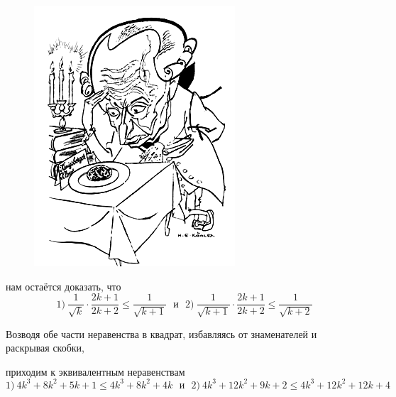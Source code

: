 {\begin{figure}[h]
\begin{minipage}{0.74\linewidth}
\end{minipage}
\hfill
\begin{minipage}{0.25\linewidth}
    \includegraphics[width=0.95\columnwidth]{img/euler_k.png}
\end{minipage}
\end{figure}}

\par
нам остаётся доказать, что
\begin{equation*}
1)~\frac{1}{\sqrt{k}} \cdot \frac{2k + 1}{2k + 2} \leq \frac{1}{\sqrt{k + 1}}
   ~~~и~~~    
  2)~\frac{1}{\sqrt{k + 1}} \cdot \frac{2k + 1}{2k + 2} \leq \frac{1}{\sqrt{k + 2}}
\end{equation*}

\par
Возводя обе части неравенства в квадрат, избавляясь от знаменателей и раскрывая скобки, 
\par
приходим к эквивалентным неравенствам
\begin{equation*}
1)~4k^3 + 8k^2 + 5k + 1 \leq 4k^3 + 8k^2 + 4k
 ~~~и~~~
  2)~4k^3 + 12k^2 + 9k + 2 \leq 4k^3 + 12k^2 + 12k + 4
\end{equation*}

